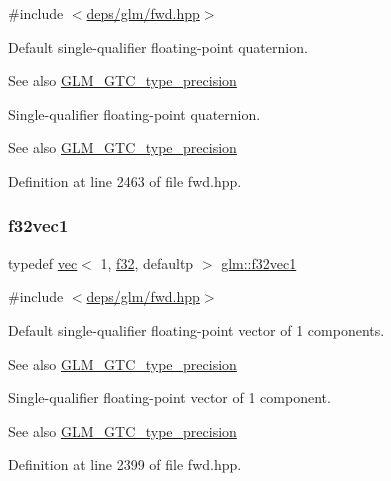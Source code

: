 {\ttfamily \#include $<$\hyperlink{fwd_8hpp}{deps/glm/fwd.\+hpp}$>$}

Default single-\/qualifier floating-\/point quaternion. \begin{DoxySeeAlso}{See also}
\hyperlink{group__gtc__type__precision}{G\+L\+M\+\_\+\+G\+T\+C\+\_\+type\+\_\+precision}
\end{DoxySeeAlso}
Single-\/qualifier floating-\/point quaternion. \begin{DoxySeeAlso}{See also}
\hyperlink{group__gtc__type__precision}{G\+L\+M\+\_\+\+G\+T\+C\+\_\+type\+\_\+precision} 
\end{DoxySeeAlso}


Definition at line 2463 of file fwd.\+hpp.

\mbox{\label{group__gtc__type__precision_ga27d40e360fd5b6ad39ca34ded8210b53}} 
\subsubsection{\texorpdfstring{f32vec1}{f32vec1}}
{\footnotesize\ttfamily typedef \hyperlink{structglm_1_1vec}{vec}$<$ 1, \hyperlink{group__gtc__type__precision_ga0ec999b57f5330d9021256e96038df04}{f32}, defaultp $>$ \hyperlink{group__gtc__type__precision_ga27d40e360fd5b6ad39ca34ded8210b53}{glm\+::f32vec1}}



{\ttfamily \#include $<$\hyperlink{fwd_8hpp}{deps/glm/fwd.\+hpp}$>$}

Default single-\/qualifier floating-\/point vector of 1 components. \begin{DoxySeeAlso}{See also}
\hyperlink{group__gtc__type__precision}{G\+L\+M\+\_\+\+G\+T\+C\+\_\+type\+\_\+precision}
\end{DoxySeeAlso}
Single-\/qualifier floating-\/point vector of 1 component. \begin{DoxySeeAlso}{See also}
\hyperlink{group__gtc__type__precision}{G\+L\+M\+\_\+\+G\+T\+C\+\_\+type\+\_\+precision} 
\end{DoxySeeAlso}


Definition at line 2399 of file fwd.\+hpp.

\mbox{\label{group__gtc__type__precision_gaeb896022a9c59e8c3c4ce627c66c9262}} 
